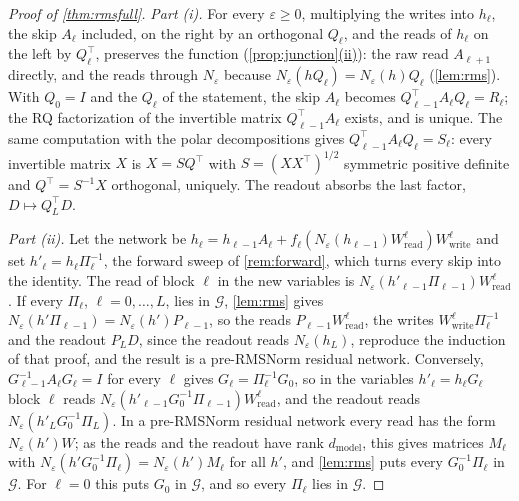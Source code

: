 \documentclass[10pt]{article}
\theoremstyle{definition}
\theoremstyle{remark}
\newcommand{\Wread}{W_{\mathrm{read}}}
\newcommand{\Wwrite}{W_{\mathrm{write}}}
\newcommand{\dm}{d_{\mathrm{model}}}
\newcommand{\G}{\mathcal{G}}
\DeclareRobustCommand{\cpref}[2]{\hyperref[#1:#2]{\cref*{#1}(#2)}}
\begin{document}
\begin{proof}[Proof of \cref{thm:rmsfull}]
\emph{Part (i).} For every $\varepsilon \ge 0$, multiplying the writes into $h_\ell$, the skip $A_\ell$ included, on the right by an orthogonal $Q_\ell$, and the reads of $h_\ell$ on the left by $Q_\ell^\top$, preserves the function (\cpref{prop:junction}{ii}): the raw read $A_{\ell+1}$ directly, and the reads through $N_\varepsilon$ because $N_\varepsilon(hQ_\ell) = N_\varepsilon(h)Q_\ell$ (\cref{lem:rms}). With $Q_0 = I$ and the $Q_\ell$ of the statement, the skip $A_\ell$ becomes $Q_{\ell-1}^\top A_\ell Q_\ell = R_\ell$; the RQ factorization of the invertible matrix $Q_{\ell-1}^\top A_\ell$ exists, and is unique. The same computation with the polar decompositions gives $Q_{\ell-1}^\top A_\ell Q_\ell = S_\ell$: every invertible matrix $X$ is $X = SQ^\top$ with $S = (XX^\top)^{1/2}$ symmetric positive definite and $Q^\top = S^{-1}X$ orthogonal, uniquely. The readout absorbs the last factor, $D \mapsto Q_L^\top D$.

\emph{Part (ii).} Let the network be $h_\ell = h_{\ell-1}A_\ell + f_\ell(N_\varepsilon(h_{\ell-1})\Wread^{\ell})\Wwrite^{\ell}$ and set $h'_\ell = h_\ell\Pi_\ell^{-1}$, the forward sweep of \cref{rem:forward}, which turns every skip into the identity. The read of block $\ell$ in the new variables is $N_\varepsilon(h'_{\ell-1}\Pi_{\ell-1})\Wread^{\ell}$. If every $\Pi_\ell$, $\ell = 0, \dots, L$, lies in $\G$, \cref{lem:rms} gives $N_\varepsilon(h'\Pi_{\ell-1}) = N_\varepsilon(h')P_{\ell-1}$, so the reads $P_{\ell-1}\Wread^{\ell}$, the writes $\Wwrite^{\ell}\Pi_\ell^{-1}$ and the readout $P_LD$, since the readout reads $N_\varepsilon(h_L)$, reproduce the induction of that proof, and the result is a pre-RMSNorm residual network. Conversely, $G_{\ell-1}^{-1}A_\ell G_\ell = I$ for every $\ell$ gives $G_\ell = \Pi_\ell^{-1}G_0$, so in the variables $h'_\ell = h_\ell G_\ell$ block $\ell$ reads $N_\varepsilon(h'_{\ell-1}G_0^{-1}\Pi_{\ell-1})\Wread^{\ell}$, and the readout reads $N_\varepsilon(h'_LG_0^{-1}\Pi_L)$. In a pre-RMSNorm residual network every read has the form $N_\varepsilon(h')W$; as the reads and the readout have rank $\dm$, this gives matrices $M_\ell$ with $N_\varepsilon(h'G_0^{-1}\Pi_\ell) = N_\varepsilon(h')M_\ell$ for all $h'$, and \cref{lem:rms} puts every $G_0^{-1}\Pi_\ell$ in $\G$. For $\ell = 0$ this puts $G_0$ in $\G$, and so every $\Pi_\ell$ lies in $\G$.


\end{proof}
\end{document}

